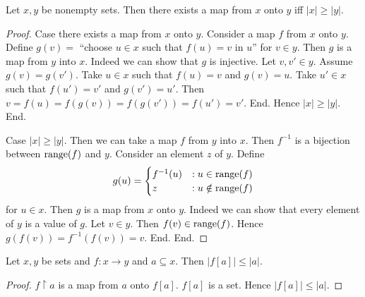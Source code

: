 \documentclass[../set-theory.tex]{subfiles}
\begin{document}
  \begin{forthel}
    \begin{proposition}
      Let $x, y$ be nonempty sets.
      Then there exists a map from $x$ onto $y$ iff $|x| \geq |y|$.
    \end{proposition}
    \begin{proof}
      Case there exists a map from $x$ onto $y$.
        Consider a map $f$ from $x$ onto $y$.
        Define $g(v) =$ ``choose $u \in x$ such that $f(u) = v$ in $u$'' for
        $v \in y$.
        Then $g$ is a map from $y$ into $x$.
        Indeed we can show that $g$ is injective.
          Let $v, v' \in y$.
          Assume $g(v) = g(v')$.
          Take $u \in x$ such that $f(u) = v$ and $g(v) = u$.
          Take $u' \in x$ such that $f(u') = v'$ and $g(v') = u'$.
          Then $v
            = f(u)
            = f(g(v))
            = f(g(v'))
            = f(u')
            = v'$.
        End.
        Hence $|x| \geq |y|$.
      End.

      Case $|x| \geq |y|$.
        Then we can take a map $f$ from $y$ into $x$.
        Then $f^{-1}$ is a bijection between $\operatorname{range}(f)$ and $y$.
        Consider an element $z$ of $y$.
        Define \[ g(u) =
          \begin{cases}
            f^{-1}(u) & : u \in \operatorname{range}(f) \\
            z         & : u \notin \operatorname{range}(f)
          \end{cases} \]
        for $u \in x$.
        Then $g$ is a map from $x$ onto $y$.
        Indeed we can show that every element of $y$ is a value of $g$.
          Let $v \in y$.
          Then $f(v) \in \operatorname{range}(f)$.
          Hence $g(f(v)) = f^{-1}(f(v)) = v$.
        End.
      End.
    \end{proof}
  \end{forthel}

  \begin{forthel}
    \begin{proposition}
      Let $x, y$ be sets and $f : x \to y$ and $a \subseteq x$.
      Then $|f[a]| \leq |a|$.
    \end{proposition}
    \begin{proof}
      $f \restriction a$ is a map from $a$ onto $f[a]$.
      $f[a]$ is a set.
      Hence $|f[a]| \leq |a|$.
    \end{proof}
  \end{forthel}
\end{document}
